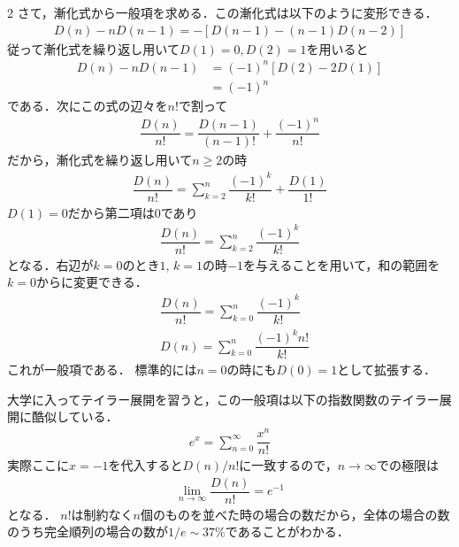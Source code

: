\documentclass[../../main.tex]{subfiles}
\begin{document}
\begin{multicols}{2}
  さて，漸化式から一般項を求める．この漸化式は以下のように変形できる．
  \begin{align}
    D(n) - nD(n-1) = -\left[D(n-1)-(n-1)D(n-2)\right]
  \end{align}
  従って漸化式を繰り返し用いて$D(1)=0, D(2)=1$を用いると
  \begin{align}
    D(n) - nD(n-1)
    & = (-1)^{n}\left[D(2)-2D(1)\right] \\
    & = (-1)^{n}
  \end{align}
  である．次にこの式の辺々を$n!$で割って
  \begin{align}
    \dfrac{D(n)}{n!} = \dfrac{D(n-1)}{(n-1)!} + \dfrac{(-1)^n}{n!}
  \end{align}
  だから，漸化式を繰り返し用いて$n \ge 2$の時
  \begin{align}
    \dfrac{D(n)}{n!} = \sum_{k=2}^{n}\dfrac{(-1)^{k}}{k!} + \dfrac{D(1)}{1!}
  \end{align}
  $D(1)=0$だから第二項は$0$であり
  \begin{align}
    \dfrac{D(n)}{n!} = \sum_{k=2}^{n}\dfrac{(-1)^{k}}{k!}
  \end{align}
  となる．右辺が$k=0$のとき$1$, $k=1$の時$-1$を与えることを用いて，和の範囲を$k=0$からに変更できる．
  \begin{align}
    & \dfrac{D(n)}{n!} = \sum_{k=0}^{n}\dfrac{(-1)^{k}}{k!} \\
    & D(n)= \sum_{k=0}^{n}\dfrac{(-1)^{k}n!}{k!}
  \end{align}
  これが一般項である．
  標準的には$n=0$の時にも$D(0)=1$として拡張する．

  大学に入ってテイラー展開を習うと，この一般項は以下の指数関数のテイラー展開に酷似している．
  \begin{align}
    e^{x} = \sum_{n=0}^{\infty}\dfrac{x^n}{n!}
  \end{align}
  実際ここに$x=-1$を代入すると$D(n)/n!$に一致するので，$n\to\infty$での極限は
  \begin{align}
    \lim_{n\to\infty}\dfrac{D(n)}{n!} = e^{-1}
  \end{align}
  となる．
  $n!$は制約なく$n$個のものを並べた時の場合の数だから，全体の場合の数のうち完全順列の場合の数が$1/e\sim 37\%$であることがわかる．

  \newpage
\end{multicols}
\end{document}
